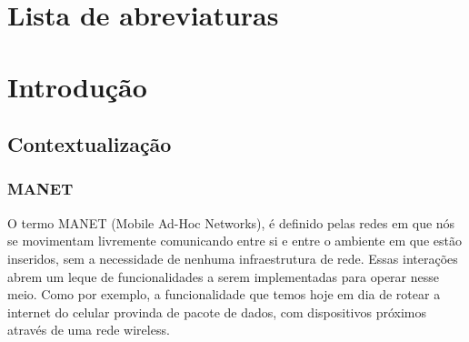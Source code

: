 \documentclass[12pt, %
openright, 
oneside,
a4paper,
brazil]{facom-ufu-abntex2}
\begin{document}


\tableofcontents*
\cleardoublepage


\chapter*{Lista de abreviaturas}
\begin{acronym}
\end{acronym}


\textual



\chapter{Introdução}
\section{Contextualização}
\subsection{MANET}
O termo MANET (Mobile Ad-Hoc Networks), é definido pelas redes em que nós se movimentam livremente comunicando entre si e entre o ambiente em que estão inseridos, sem a necessidade de nenhuma infraestrutura de rede. Essas interações abrem um leque de funcionalidades a serem implementadas para operar nesse meio. Como por exemplo, a funcionalidade que temos hoje em dia de rotear a internet do celular provinda de pacote de dados, com dispositivos próximos através de uma rede wireless.
\end{document}
